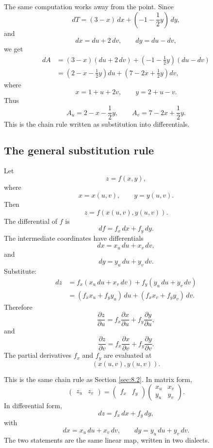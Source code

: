 The same computation works away from the point.  Since
\[
    dT=(3-x)\,dx+\left(-1-\frac12y\right)\,dy,
\]
and
\[
    dx=du+2\,dv,
    \qquad
    dy=du-dv,
\]
we get
\[
\begin{aligned}
    dA
    &=
    (3-x)(du+2\,dv)
    +
    \left(-1-\frac12y\right)(du-dv)\\
    &=
    \left(2-x-\frac12y\right)du
    +
    \left(7-2x+\frac12y\right)dv,
\end{aligned}
\]
where
\[
    x=1+u+2v,
    \qquad
    y=2+u-v.
\]
Thus
\[
    A_u=
    2-x-\frac12y,
    \qquad
    A_v=
    7-2x+\frac12y.
\]
This is the chain rule written as substitution into differentials.

\subsection{The general substitution rule}

Let
\[
    z=f(x,y),
\]
where
\[
    x=x(u,v),
    \qquad
    y=y(u,v).
\]
Then
\[
    z=f(x(u,v),y(u,v)).
\]
The differential of \(f\) is
\[
    df=f_x\,dx+f_y\,dy.
\]
The intermediate coordinates have differentials
\[
    dx=x_u\,du+x_v\,dv,
\]
and
\[
    dy=y_u\,du+y_v\,dv.
\]
Substitute:
\[
\begin{aligned}
    dz
    &=
    f_x(x_u\,du+x_v\,dv)
    +
    f_y(y_u\,du+y_v\,dv)\\
    &=
    (f_xx_u+f_yy_u)\,du
    +
    (f_xx_v+f_yy_v)\,dv.
\end{aligned}
\]
Therefore
\[
\boxed{
    \frac{\partial z}{\partial u}
    =
    f_x\frac{\partial x}{\partial u}
    +
    f_y\frac{\partial y}{\partial u},
}
\]
and
\[
\boxed{
    \frac{\partial z}{\partial v}
    =
    f_x\frac{\partial x}{\partial v}
    +
    f_y\frac{\partial y}{\partial v}.
}
\]
The partial derivatives \(f_x\) and \(f_y\) are evaluated at
\[
    (x(u,v),y(u,v)).
\]

This is the same chain rule as Section \ref{sec:8.2}.  In matrix form,
\[
    \begin{pmatrix}
        z_u & z_v
    \end{pmatrix}
    =
    \begin{pmatrix}
        f_x & f_y
    \end{pmatrix}
    \begin{pmatrix}
        x_u & x_v\\
        y_u & y_v
    \end{pmatrix}.
\]
In differential form,
\[
    dz=f_x\,dx+f_y\,dy,
\]
with
\[
    dx=x_u\,du+x_v\,dv,
    \qquad
    dy=y_u\,du+y_v\,dv.
\]
The two statements are the same linear map, written in two dialects.

